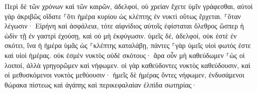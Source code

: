 \documentclass{openreader}
\begin{document}
Περὶ δὲ τῶν χρόνων καὶ τῶν καιρῶν, ἀδελφοί, οὐ χρείαν ἔχετε ὑμῖν γράφεσθαι, 
αὐτοὶ γὰρ ἀκριβῶς οἴδατε ⸀ὅτι ἡμέρα κυρίου ὡς κλέπτης ἐν νυκτὶ οὕτως ἔρχεται. 
⸀ὅταν λέγωσιν· Εἰρήνη καὶ ἀσφάλεια, τότε αἰφνίδιος αὐτοῖς ἐφίσταται ὄλεθρος ὥσπερ ἡ ὠδὶν τῇ ἐν γαστρὶ ἐχούσῃ, καὶ οὐ μὴ ἐκφύγωσιν. 
ὑμεῖς δέ, ἀδελφοί, οὐκ ἐστὲ ἐν σκότει, ἵνα ἡ ἡμέρα ὑμᾶς ὡς ⸀κλέπτης καταλάβῃ, 
πάντες ⸀γὰρ ὑμεῖς υἱοὶ φωτός ἐστε καὶ υἱοὶ ἡμέρας. οὐκ ἐσμὲν νυκτὸς οὐδὲ σκότους· 
ἄρα οὖν μὴ καθεύδωμεν ⸀ὡς οἱ λοιποί, ἀλλὰ γρηγορῶμεν καὶ νήφωμεν. 
οἱ γὰρ καθεύδοντες νυκτὸς καθεύδουσιν, καὶ οἱ μεθυσκόμενοι νυκτὸς μεθύουσιν· 
ἡμεῖς δὲ ἡμέρας ὄντες νήφωμεν, ἐνδυσάμενοι θώρακα πίστεως καὶ ἀγάπης καὶ περικεφαλαίαν ἐλπίδα σωτηρίας· 
\end{document}
